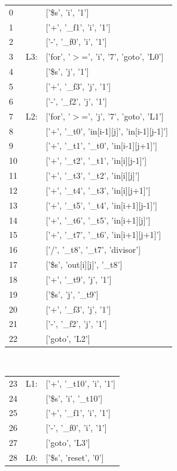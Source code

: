 \begin{tabular}{l l l}
0   & &    ['\$s', 'i', '1'] \\
1     & &  ['+', '\_f1', 'i', '1']\\ 
2 & &      ['-', '\_f0', 'i', '1'] \\
3  & L3:& ['for', '$>$=', 'i', '7', 'goto', 'L0']\\ 
4 & &      ['\$s', 'j', '1'] \\
5    & &   ['+', '\_f3', 'j', '1'] \\
6       & &['-', '\_f2', 'j', '1'] \\
7   &L2:& ['for', '$>$=', 'j', '7', 'goto', 'L1'] \\
8   & &    ['+', '\_t0', 'in[i-1][j]', 'in[i-1][j-1]'] \\
9  & &     ['+', '\_t1', '\_t0', 'in[i-1][j+1]'] \\
10    & &  ['+', '\_t2', '\_t1', 'in[i][j-1]']\\
11& &   ['+', '\_t3', '\_t2', 'in[i][j]']\\
12& &   ['+', '\_t4', '\_t3', 'in[i][j+1]']\\
13& &   ['+', '\_t5', '\_t4', 'in[i+1][j-1]']\\
14& &   ['+', '\_t6', '\_t5', 'in[i+1][j]']\\
15 & &  ['+', '\_t7', '\_t6', 'in[i+1][j+1]']\\ 
16 & &  ['/', '\_t8', '\_t7', 'divisor'] \\
17 & &  ['\$s', 'out[i][j]', '\_t8'] \\
18 & &  ['+', '\_t9', 'j', '1'] \\
19 & &  ['\$s', 'j', '\_t9'] \\
20 & &  ['+', '\_f3', 'j', '1']\\
21 & &  ['-', '\_f2', 'j', '1'] \\
22 & &  ['goto', 'L2']
\end{tabular}\\

\begin{tabular}{l l l}
23  &L1:& ['+', '\_t10', 'i', '1']\\
24 & &  ['\$s', 'i', '\_t10'] \\
25 & &  ['+', '\_f1', 'i', '1']\\
26 & &  ['-', '\_f0', 'i', '1']\\
27 & &  ['goto', 'L3']\\
28  &L0:& ['\$s', 'reset', '0']\\

\end{tabular}\\

